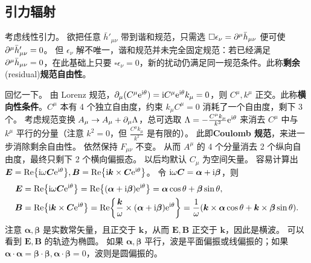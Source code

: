
\subsection{引力辐射}

考虑线性引力。
欲把任意 $\bar h'_{\mu\nu}$ 带到谐和规范，只需选 $\square\epsilon_\nu=\partial^\mu\bar h_{\mu\nu}$ 便可使 $\partial^\mu\bar h'_{\mu\nu} = 0$。
但 $\epsilon_\nu$ 解不唯一，谐和规范并未完全固定规范：若已经满足 $\partial^\mu\bar h_{\mu\nu}=0$，在此基础上只要 $\square\epsilon_\nu=0$，新的扰动仍满足同一规范条件。此称\textbf{剩余}(residual)\textbf{规范自由性}。

回忆一下。
由 Lorenz 规范，$\partial_\mu (C^\mu\mathrm{e}^{\mathrm{i}\theta}) = \mathrm{i} C^\mu\mathrm{e}^{\mathrm{i}\theta} k_\mu = 0$，则 $C^\mu,k^\mu$ 正交。此称\textbf{横向性条件}。$C^\mu$ 本有 4 个独立自由度，约束 $k_\mu C^\mu = 0$ 消耗了一个自由度，剩下 3 个。
考虑规范变换 $A_\mu \to A_\mu + \partial_\mu \Lambda$，总可选取 $\Lambda = -\frac{C^\mu k_\mu}{k^2}\mathrm{e}^{\mathrm{i}\theta}$ 来消去 $C^\mu$ 中与 $k^\mu$ 平行的分量（注意 $k^2=0$，但 $\frac{C^\mu k_\mu}{k^2}$ 是有限的）。
此即\textbf{Coulomb 规范}，来进一步消除剩余自由性。
依然保持 $F_{\mu\nu}$ 不变。
从而 $A^\mu$ 的 4 个分量消去 2 个纵向自由度，最终只剩下 2 个横向偏振态。
以后均默认 $C_\mu$ 为空间矢量。
容易计算出 $\bm{E} = \Re{\mathrm{i}\omega \bm{C} \mathrm{e}^{\mathrm{i}\theta}},
\bm{B} = \Re{\mathrm{i}\bm{k} \times \bm{C} \mathrm{e}^{\mathrm{i}\theta}}$。
令 $\mathrm{i}\omega\bm{C} = \bm{\alpha} + \mathrm{i}\bm{\beta}$，则
\begin{align*}
\bm{E} &= \Re{\mathrm{i}\omega \bm{C} \mathrm{e}^{\mathrm{i}\theta}} = \Re{(\bm{\alpha} + \mathrm{i}\bm{\beta}) \mathrm{e}^{\mathrm{i}\theta}} = \bm{\alpha} \cos \theta + \bm{\beta} \sin \theta,\\
\bm{B} &= \Re{\mathrm{i}\bm{k} \times \bm{C} \mathrm{e}^{\mathrm{i}\theta}} = \Re{\frac{\bm{k}}{\omega} \times (\bm{\alpha} + \mathrm{i}\bm{\beta}) \mathrm{e}^{\mathrm{i}\theta}} = \frac{1}{\omega}(\bm{k} \times \bm{\alpha} \cos \theta + \bm{k} \times \bm{\beta} \sin \theta).
\end{align*}
注意 $\bm{\alpha},\bm{\beta}$ 是实数常矢量，且正交于 $\bm k$，从而 $\bm{E},\bm{B}$ 正交于 $\bm k$，因此是横波。
可以看到 $\bm E,\bm B$ 的轨迹为椭圆。
如果 $\bm{\alpha},\bm{\beta}$ 平行，波是平面偏振或线偏振的；如果 $\bm{\alpha} \cdot \bm{\alpha}=\bm{\beta} \cdot \bm{\beta},\bm{\alpha} \cdot \bm{\beta}=0$，波则是圆偏振的。

